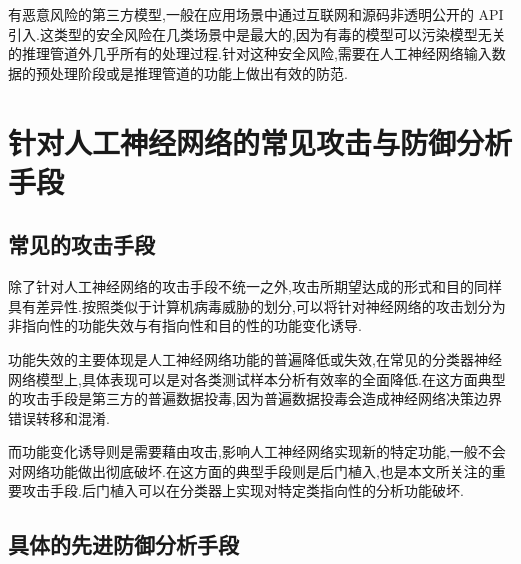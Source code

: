 有恶意风险的第三方模型,一般在应用场景中通过互联网和源码非透明公开的 API 引入.这类型的安全风险在几类场景中是最大的,因为有毒的模型可以污染模型无关的推理管道外几乎所有的处理过程.针对这种安全风险,需要在人工神经网络输入数据的预处理阶段或是推理管道的功能上做出有效的防范\cite{backdoordisanfang}.

\section{针对人工神经网络的常见攻击与防御分析手段}
\subsection{常见的攻击手段}
除了针对人工神经网络的攻击手段不统一之外,攻击所期望达成的形式和目的同样具有差异性.按照类似于计算机病毒威胁的划分,可以将针对神经网络的攻击划分为非指向性的功能失效与有指向性和目的性的功能变化诱导.

功能失效的主要体现是人工神经网络功能的普遍降低或失效,在常见的分类器神经网络模型上,具体表现可以是对各类测试样本分析有效率的全面降低.在这方面典型的攻击手段是第三方的普遍数据投毒,因为普遍数据投毒会造成神经网络决策边界错误转移和混淆.

而功能变化诱导则是需要藉由攻击,影响人工神经网络实现新的特定功能,一般不会对网络功能做出彻底破坏.在这方面的典型手段则是后门植入,也是本文所关注的重要攻击手段.后门植入可以在分类器上实现对特定类指向性的分析功能破坏.

\subsection{具体的先进防御分析手段}

